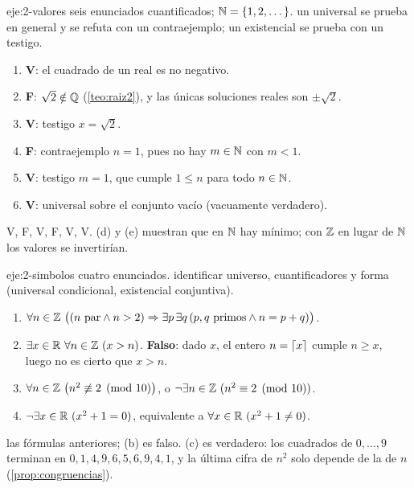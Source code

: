 \begin{solucion}{eje:2-valores}
\datos seis enunciados cuantificados; $\mathbb{N}=\{1,2,\dots\}$.
\planteamiento un universal se prueba en general y se refuta con un contraejemplo; un existencial se prueba con un testigo.
\pasos
\begin{enumerate}[label=(\alph*)]
  \item \textbf{V}: el cuadrado de un real es no negativo.
  \item \textbf{F}: $\sqrt2\notin\mathbb{Q}$ (\cref{teo:raiz2}), y las únicas soluciones reales son $\pm\sqrt2$.
  \item \textbf{V}: testigo $x=\sqrt2$.
  \item \textbf{F}: contraejemplo $n=1$, pues no hay $m\in\mathbb{N}$ con $m<1$.
  \item \textbf{V}: testigo $m=1$, que cumple $1\le n$ para todo $n\in\mathbb{N}$.
  \item \textbf{V}: universal sobre el conjunto vacío (vacuamente verdadero).
\end{enumerate}
\resultado V, F, V, F, V, V.
\comprobacion (d) y (e) muestran que en $\mathbb{N}$ hay mínimo; con $\mathbb{Z}$ en lugar de $\mathbb{N}$ los valores se invertirían.
\end{solucion}

\begin{solucion}{eje:2-simbolos}
\datos cuatro enunciados.
\planteamiento identificar universo, cuantificadores y forma (universal condicional, existencial conjuntiva).
\pasos
\begin{enumerate}[label=(\alph*)]
  \item $\forall n\in\mathbb{Z}\ \bigl((n\text{ par}\wedge n>2)\Rightarrow\exists p\,\exists q\,(p,q\text{ primos}\wedge n=p+q)\bigr)$.
  \item $\exists x\in\R\ \forall n\in\Z\ (x>n)$. \textbf{Falso}: dado $x$, el entero $n=\lceil x\rceil$ cumple $n\ge x$, luego no es cierto que $x>n$.
  \item $\forall n\in\mathbb{Z}\ \bigl(n^{2}\not\equiv 2\pmod{10}\bigr)$, o $\neg\exists n\in\mathbb{Z}\ (n^{2}\equiv 2\pmod{10})$.
  \item $\neg\exists x\in\R\ (x^{2}+1=0)$, equivalente a $\forall x\in\mathbb{R}\ (x^{2}+1\neq 0)$.
\end{enumerate}
\resultado las fórmulas anteriores; (b) es falso.
\comprobacion (c) es verdadero: los cuadrados de $0,\dots,9$ terminan en $0,1,4,9,6,5,6,9,4,1$, y la última cifra de $n^{2}$ solo depende de la de $n$ (\cref{prop:congruencias}).
\end{solucion}

